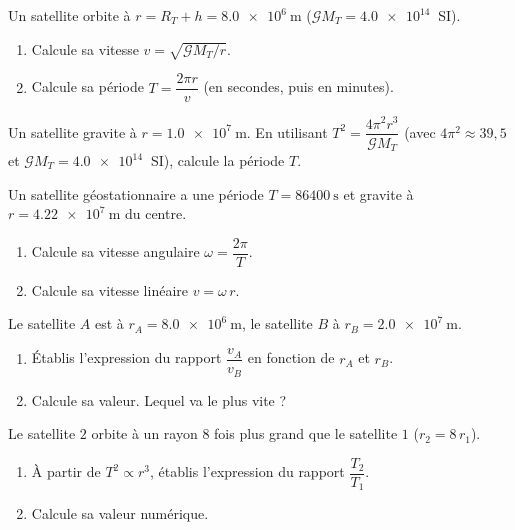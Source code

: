 \documentclass[11pt,a4paper]{article}
\begin{document}

\begin{exo}
Un satellite orbite à $r=R_T+h=\qty{8.0e6}{\metre}$ ($\mathcal{G}M_T=\qty{4.0e14}{}$ SI).
\begin{enumerate}[label=\alph*)]
  \item Calcule sa vitesse $v=\sqrt{\mathcal{G}M_T/r}$.
  \item Calcule sa période $T=\dfrac{2\pi r}{v}$ (en secondes, puis en minutes).
\end{enumerate}
\end{exo}

\begin{exo}
Un satellite gravite à $r=\qty{1.0e7}{\metre}$. En utilisant
$T^2=\dfrac{4\pi^2 r^3}{\mathcal{G}M_T}$ (avec $4\pi^2\approx 39{,}5$ et
$\mathcal{G}M_T=\qty{4.0e14}{}$ SI), calcule la période $T$.
\end{exo}

\begin{exo}
Un satellite géostationnaire a une période $T=\qty{86400}{\second}$ et gravite à
$r=\qty{4.22e7}{\metre}$ du centre.
\begin{enumerate}[label=\alph*)]
  \item Calcule sa vitesse angulaire $\omega=\dfrac{2\pi}{T}$.
  \item Calcule sa vitesse linéaire $v=\omega\,r$.
\end{enumerate}
\end{exo}

\begin{exo}
Le satellite $A$ est à $r_A=\qty{8.0e6}{\metre}$, le satellite $B$ à
$r_B=\qty{2.0e7}{\metre}$.
\begin{enumerate}[label=\alph*)]
  \item Établis l'expression du rapport $\dfrac{v_A}{v_B}$ en fonction de $r_A$ et $r_B$.
  \item Calcule sa valeur. Lequel va le plus vite ?
\end{enumerate}
\end{exo}

\begin{exo}
Le satellite $2$ orbite à un rayon $8$ fois plus grand que le satellite $1$
($r_2=8\,r_1$).
\begin{enumerate}[label=\alph*)]
  \item À partir de $T^2\propto r^3$, établis l'expression du rapport $\dfrac{T_2}{T_1}$.
  \item Calcule sa valeur numérique.
\end{enumerate}
\end{exo}
\end{document}
